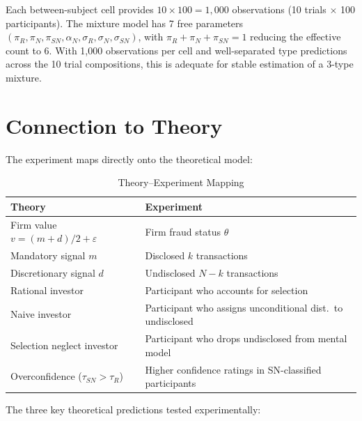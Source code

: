 \documentclass[12pt]{article}
\theoremstyle{definition}
\begin{document}
Each between-subject cell provides $10 \times 100 = 1{,}000$ observations (10 trials $\times$ 100 participants). The mixture model has 7 free parameters $(\pi_R, \pi_N, \pi_{SN}, \alpha_N, \sigma_R, \sigma_N, \sigma_{SN})$, with $\pi_R + \pi_N + \pi_{SN} = 1$ reducing the effective count to 6. With 1,000 observations per cell and well-separated type predictions across the 10 trial compositions, this is adequate for stable estimation of a 3-type mixture.


\section{Connection to Theory}
\label{sec:connection}

The experiment maps directly onto the theoretical model:

\begin{table}[h!]
\centering
\caption{Theory--Experiment Mapping}
\label{tab:mapping}
\begin{tabular}{ll}
\toprule
Theory & Experiment \\
\midrule
Firm value $v = (m+d)/2 + \varepsilon$ & Firm fraud status $\theta$ \\
Mandatory signal $m$ & Disclosed $k$ transactions \\
Discretionary signal $d$ & Undisclosed $N-k$ transactions \\
Rational investor & Participant who accounts for selection \\
Naive investor & Participant who assigns unconditional dist.\ to undisclosed \\
Selection neglect investor & Participant who drops undisclosed from mental model \\
Overconfidence ($\tau_{SN} > \tau_R$) & Higher confidence ratings in SN-classified participants \\
\bottomrule
\end{tabular}
\end{table}

The three key theoretical predictions tested experimentally:
\end{document}
